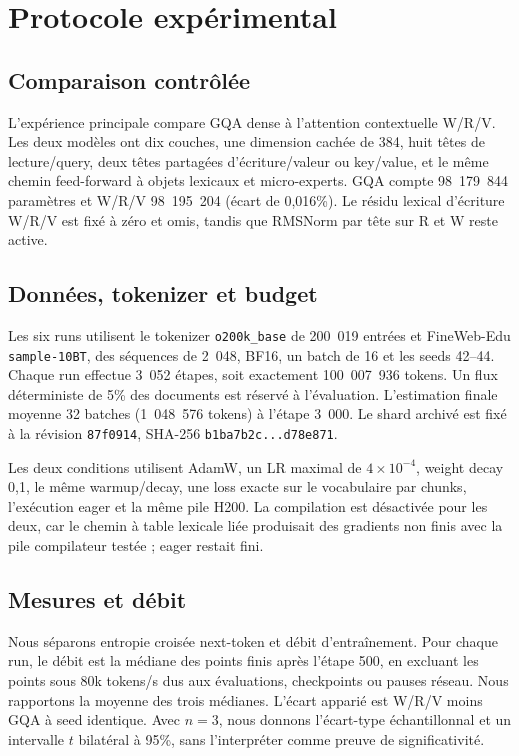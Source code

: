 \section{Protocole expérimental}
\label{sec:experiments}

\subsection{Comparaison contrôlée}

L'expérience principale compare GQA dense à l'attention contextuelle W/R/V. Les deux modèles ont dix couches, une dimension cachée de 384, huit têtes de lecture/query, deux têtes partagées d'écriture/valeur ou key/value, et le même chemin feed-forward à objets lexicaux et micro-experts. GQA compte 98~179~844 paramètres et W/R/V 98~195~204 (écart de 0,016\%). Le résidu lexical d'écriture W/R/V est fixé à zéro et omis, tandis que RMSNorm par tête sur R et W reste active.

\subsection{Données, tokenizer et budget}

Les six runs utilisent le tokenizer \texttt{o200k\_base} de 200~019 entrées et FineWeb-Edu \texttt{sample-10BT}, des séquences de 2~048, BF16, un batch de 16 et les seeds 42--44. Chaque run effectue 3~052 étapes, soit exactement 100~007~936 tokens. Un flux déterministe de 5\% des documents est réservé à l'évaluation. L'estimation finale moyenne 32 batches (1~048~576 tokens) à l'étape 3~000. Le shard archivé est fixé à la révision \texttt{87f0914}, SHA-256 \texttt{b1ba7b2c...d78e871}.

Les deux conditions utilisent AdamW, un LR maximal de $4\times10^{-4}$, weight decay 0,1, le même warmup/decay, une loss exacte sur le vocabulaire par chunks, l'exécution eager et la même pile H200. La compilation est désactivée pour les deux, car le chemin à table lexicale liée produisait des gradients non finis avec la pile compilateur testée ; eager restait fini.

\subsection{Mesures et débit}

Nous séparons entropie croisée next-token et débit d'entraînement. Pour chaque run, le débit est la médiane des points finis après l'étape 500, en excluant les points sous 80k tokens/s dus aux évaluations, checkpoints ou pauses réseau. Nous rapportons la moyenne des trois médianes. L'écart apparié est W/R/V moins GQA à seed identique. Avec $n=3$, nous donnons l'écart-type échantillonnal et un intervalle $t$ bilatéral à 95\%, sans l'interpréter comme preuve de significativité.

